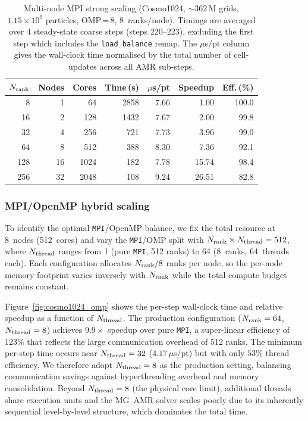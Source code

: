 \documentclass[fleqn,usenatbib]{mnras}
\newcommand{\nrank}{N_{\rm rank}}
\newcommand{\nthread}{N_{\rm thread}}
\newcommand{\code}[1]{\texttt{#1}}
\newcommand{\mpi}[0]{\texttt{MPI}}
\begin{document}
\begin{table}
\centering
\caption{Multi-node MPI strong scaling (Cosmo1024,
  ${\sim}362\,\mathrm{M}$ grids, $1.15 \times 10^9$ particles,
  OMP\,=\,8, 8~ranks/node).  Timings are averaged over 4
  steady-state coarse steps (steps 220--223), excluding the first
  step which includes the \code{load\_balance} remap.  The
  $\mu$s/pt column gives the wall-clock time normalised by the
  total number of cell-updates across all AMR sub-steps.}
\label{tab:mpi_scaling}
\begin{tabular}{@{\,}r@{\;\;}r@{\;\;}r@{\;\;}r@{\;\;}r@{\;\;}r@{\;\;}r@{\,}}
\hline
$\nrank$ & Nodes & Cores & Time\,(s) & $\mu$s/pt & Speedup & Eff.\,(\%) \\
\hline
   8 &  1 &   64 & 2858 & 7.66 &  1.00 & 100.0 \\
  16 &  2 &  128 & 1432 & 7.67 &  2.00 &  99.8 \\
  32 &  4 &  256 &  721 & 7.73 &  3.96 &  99.0 \\
  64 &  8 &  512 &  388 & 8.30 &  7.36 &  92.1 \\
 128 & 16 & 1024 &  182 & 7.78 & 15.74 &  98.4 \\
 256 & 32 & 2048 &  108 & 9.24 & 26.51 &  82.8 \\
\hline
\end{tabular}
\end{table}

\subsubsection{MPI/OpenMP hybrid scaling}
\label{sec:perf_multinode_omp}

To identify the optimal \mpi/OpenMP balance, we fix the total
resource at 8~nodes (512~cores) and vary the \mpi/OMP split with
$\nrank \times \nthread = 512$, where $\nthread$ ranges from
1 (pure \mpi, 512 ranks) to 64 (8~ranks, 64~threads each).  Each
configuration allocates $\nrank/8$ ranks per node, so the per-node
memory footprint varies inversely with $\nrank$ while the total
compute budget remains constant.

Figure~\ref{fig:cosmo1024_omp} shows the per-step wall-clock
time and relative speedup as a function of $\nthread$.
The production configuration ($\nrank = 64$, $\nthread = 8$)
achieves $9.9\times$ speedup over pure \mpi, a super-linear
efficiency of $123\%$ that reflects the large communication
overhead of 512 ranks.  The minimum per-step time occurs near
$\nthread = 32$ ($4.17\,\mu$s/pt) but with only $53\%$
thread efficiency. We therefore adopt $\nthread = 8$ as the
production setting, balancing communication savings against
hyperthreading overhead and memory consolidation.
Beyond $\nthread = 8$ (the physical core limit), additional
threads share execution units and the MG~AMR solver scales poorly due to its inherently sequential level-by-level structure, which dominates the total time.
\end{document}

